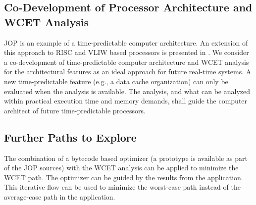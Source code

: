%
%

\subsection{Co-Development of Processor Architecture and WCET
Analysis}

JOP is an example of a time-predictable computer architecture. An
extension of this approach to RISC and VLIW based processors is
presented in \cite{tpca:jes}. We consider a co-development of
time-predictable computer architecture and WCET analysis for the
architectural features as an ideal approach for future real-time
systems. A new time-predictable feature (e.g., a data cache
organization) can only be evaluated when the analysis is available.
The analysis, and what can be analyzed within practical execution
time and memory demands, shall guide the computer architect of future
time-predictable processors.

\subsection{Further Paths to Explore}

The combination of a bytecode based optimizer (a prototype is
available as part of the JOP sources) with the WCET analysis can be
applied to minimize the WCET path. The optimizer can be guided by the
results from the application. This iterative flow can be used to
minimize the worst-case path instead of the average-case path in the
application.

